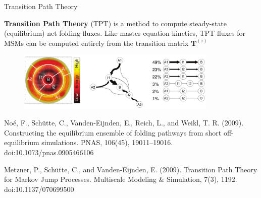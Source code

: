 \documentclass{beamer}
\begin{document}
\begin{frame}{Transition Path Theory}

\textbf{Transition Path Theory} (TPT) is a method to compute steady-state (equilibrium) net folding fluxes.  Like master equation kinetics, TPT fluxes for MSMs can be computed entirely from the transition matrix $\mathbf{T}^{(\tau)}$

\begin{figure}
\includegraphics[width=0.85\textwidth]{TPT-Noe}
\end{figure}


\tiny
No\'{e}, F., Sch\"{u}tte, C., Vanden-Eijnden, E., Reich, L., and  Weikl, T. R. (2009). Constructing the equilibrium ensemble of folding pathways from short off-equilibrium simulations. PNAS, 106(45), 19011–19016. doi:10.1073/pnas.0905466106

Metzner, P., Sch\"{u}tte, C., and Vanden-Eijnden, E. (2009). Transition Path Theory for Markov Jump Processes. Multiscale Modeling \& Simulation, 7(3), 1192. doi:10.1137/070699500
\normalsize

\end{frame}
\end{document}
